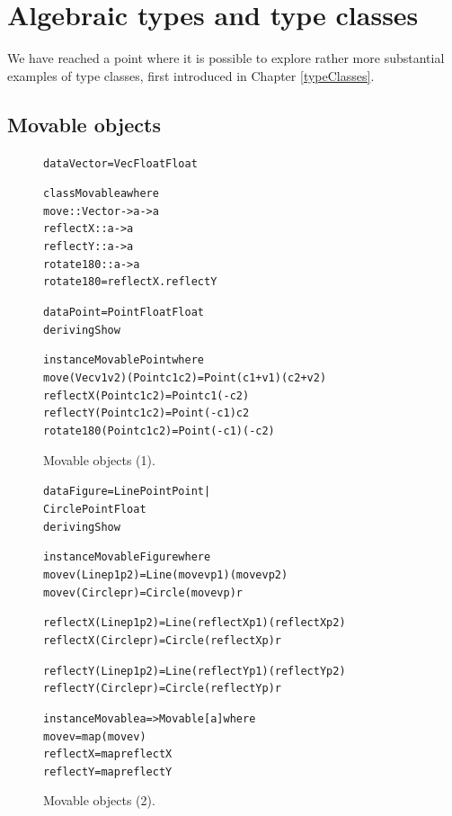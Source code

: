  
\section{Algebraic types and type classes}
\label{algClasses}
\label{oop}


We have reached a point where it is possible to explore rather more
substantial examples of type classes, first introduced in Chapter \ref{typeClasses}. 

\subsection*{Movable objects}



\begin{figure}[t]
\begin{alltt}
data Vector = Vec Float Float

class Movable a where
  move      :: Vector -> a -> a
  reflectX  :: a -> a
  reflectY  :: a -> a
  rotate180 :: a -> a
  rotate180 = reflectX . reflectY

data Point = Point Float Float 
             deriving Show

instance Movable Point where
  move (Vec v1 v2) (Point c1 c2) = Point (c1+v1) (c2+v2)
  reflectX (Point c1 c2)  = Point c1 (-c2)
  reflectY (Point c1 c2)  = Point (-c1) c2
  rotate180 (Point c1 c2) = Point (-c1) (-c2)
\end{alltt}
\caption{Movable objects (1).}
\label{movOb1}
\end{figure}

\begin{figure}[t]
\begin{alltt}
data Figure = Line Point Point |
              Circle Point Float 
              deriving Show

instance Movable Figure where
  move v (Line p1 p2) = Line (move v p1) (move v p2)
  move v (Circle p r) = Circle (move v p) r

  reflectX (Line p1 p2) = Line (reflectX p1) (reflectX p2)
  reflectX (Circle p r) = Circle (reflectX p) r

  reflectY (Line p1 p2) = Line (reflectY p1) (reflectY p2)
  reflectY (Circle p r) = Circle (reflectY p) r

instance Movable a => Movable [a] where
  move v   = map (move v)
  reflectX = map reflectX
  reflectY = map reflectY
\end{alltt}
\caption{Movable objects (2).}
\label{movOb2}
\end{figure}



